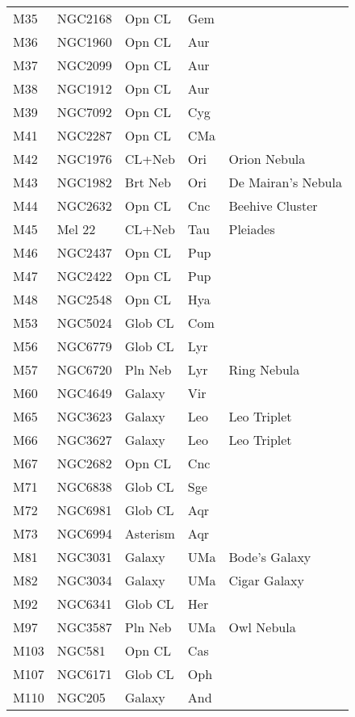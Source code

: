 \begin{longtable}{ p{0.7in}  p{1.0in}  p{0.6in}  p{0.9in}  p{5.1in} }
M35 & NGC2168 & Opn CL & Gem &  \\ 
M36 & NGC1960 & Opn CL & Aur &  \\ 
M37 & NGC2099 & Opn CL & Aur &  \\ 
M38 & NGC1912 & Opn CL & Aur &  \\ 
M39 & NGC7092 & Opn CL & Cyg &  \\ 
M41 & NGC2287 & Opn CL & CMa &  \\ 
M42 & NGC1976 & CL+Neb & Ori & Orion Nebula \\ 
M43 & NGC1982 & Brt Neb & Ori & De Mairan's Nebula \\ 
M44 & NGC2632 & Opn CL & Cnc & Beehive Cluster \\ 
M45 & Mel 22 & CL+Neb & Tau & Pleiades \\ 
M46 & NGC2437 & Opn CL & Pup &  \\ 
M47 & NGC2422 & Opn CL & Pup &  \\ 
M48 & NGC2548 & Opn CL & Hya &  \\ 
M53 & NGC5024 & Glob CL & Com &  \\ 
M56 & NGC6779 & Glob CL & Lyr &  \\ 
M57 & NGC6720 & Pln Neb & Lyr & Ring Nebula \\ 
M60 & NGC4649 & Galaxy & Vir &  \\ 
M65 & NGC3623 & Galaxy & Leo & Leo Triplet \\ 
M66 & NGC3627 & Galaxy & Leo & Leo Triplet \\ 
M67 & NGC2682 & Opn CL & Cnc &  \\ 
M71 & NGC6838 & Glob CL & Sge &  \\ 
M72 & NGC6981 & Glob CL & Aqr &  \\ 
M73 & NGC6994 & Asterism & Aqr &  \\ 
M81 & NGC3031 & Galaxy & UMa & Bode's Galaxy \\ 
M82 & NGC3034 & Galaxy & UMa & Cigar Galaxy \\ 
M92 & NGC6341 & Glob CL & Her &  \\ 
M97 & NGC3587 & Pln Neb & UMa & Owl Nebula \\ 
M103 & NGC581 & Opn CL & Cas &  \\ 
M107 & NGC6171 & Glob CL & Oph &  \\ 
M110 & NGC205 & Galaxy & And &  \\ 
\hline 
\end{longtable} 
